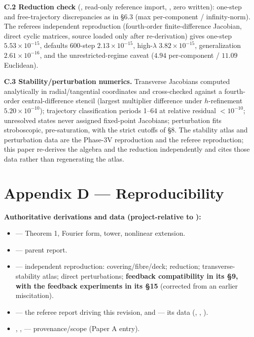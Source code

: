 \documentclass[
  11pt,
  a4paper,
]{article}
\providecommand{\tightlist}{%
  \setlength{\itemsep}{0pt}\setlength{\parskip}{0pt}}
\begin{document}
\textbf{C.2 Reduction check} (, read-only reference import, , zero  written): one-step and free-trajectory discrepancies as in §6.3 (max per-component / infinity-norm). The referee\textquotesingle s independent reproduction (fourth-order finite-difference Jacobian, direct cyclic matrices, source loaded only after re-derivation) gives one-step \(5.53\times10^{-15}\), defaults 600-step \(2.13\times10^{-15}\), high-\(\lambda\) \(3.82\times10^{-15}\), generalization \(2.61\times10^{-16}\), and the unrestricted-regime caveat (\(4.94\) per-component / \(11.09\) Euclidean).

\textbf{C.3 Stability/perturbation numerics.} Transverse Jacobians computed analytically in radial/tangential coordinates and cross-checked against a fourth-order central-difference stencil (largest multiplier difference under \(h\)-refinement \(5.20\times10^{-10}\)); trajectory classification periods 1--64 at relative residual \(<10^{-10}\); unresolved states never assigned fixed-point Jacobians; perturbation fits stroboscopic, pre-saturation, with the strict cutoffs of §8. The stability atlas and perturbation data are the Phase-3V reproduction and the referee reproduction; this paper re-derives the algebra and the reduction independently and cites those data rather than regenerating the atlas.

\section{Appendix D --- Reproducibility}\label{appendix-d-reproducibility}

\textbf{Authoritative derivations and data (project-relative to ):}

\begin{itemize}
\tightlist
\item
   --- Theorem 1, Fourier form, tower, nonlinear extension.
\item
   --- parent report.
\item
   --- independent reproduction: covering/fibre/deck; reduction; transverse-stability atlas; direct perturbations; \textbf{feedback compatibility in its §9, with the feedback experiments in its §15} (corrected from an earlier miscitation).
\item
   --- the referee report driving this revision, and  --- its data (, , ).
\item
  , ,  --- provenance/scope (Paper A entry).
\end{itemize}
\end{document}
